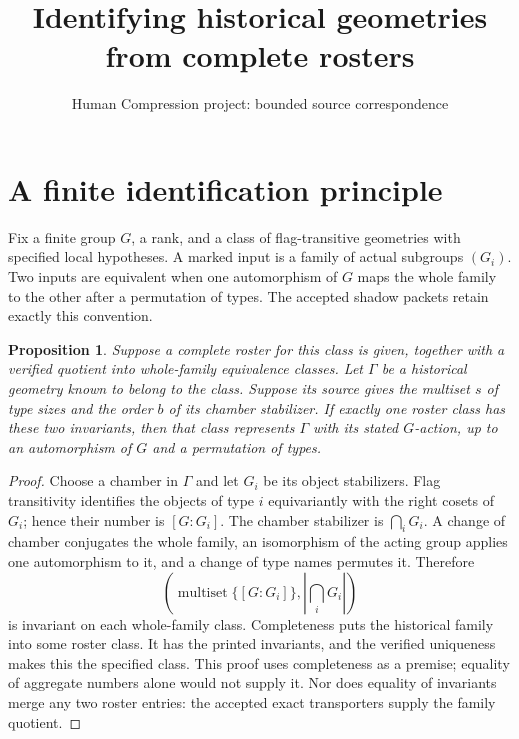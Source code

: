 \documentclass[11pt,a4paper]{article}
\title{Identifying historical geometries from complete rosters}
\author{Human Compression project: bounded source correspondence}
\date{}
\newtheorem{proposition}{Proposition}
\begin{document}
\maketitle
\section{A finite identification principle}
Fix a finite group $G$, a rank, and a class of flag-transitive geometries
with specified local hypotheses. A marked input is a family of actual
subgroups $(G_i)$. Two inputs are equivalent when one automorphism of $G$
maps the whole family to the other after a permutation of types. The
accepted shadow packets retain exactly this convention.

\begin{proposition}
Suppose a complete roster for this class is given, together with a
verified quotient into whole-family equivalence classes. Let $\Gamma$
be a historical geometry known to belong to the class. Suppose its
source gives the multiset $s$ of type sizes and the order $b$ of its
chamber stabilizer. If exactly one roster class has these two invariants,
then that class represents $\Gamma$ with its stated $G$-action, up to
an automorphism of $G$ and a permutation of types.
\end{proposition}
\begin{proof}
Choose a chamber in $\Gamma$ and let $G_i$ be its object stabilizers.
Flag transitivity identifies the objects of type $i$ equivariantly with
the right cosets of $G_i$; hence their number is $[G:G_i]$. The chamber
stabilizer is $\bigcap_iG_i$. A change of chamber conjugates the whole
family, an isomorphism of the acting group applies one automorphism to
it, and a change of type names permutes it. Therefore
\[
 \left(\operatorname{multiset}\{[G:G_i]\},
       \left|\bigcap_iG_i\right|\right)
\]
is invariant on each whole-family class. Completeness puts the historical
family into some roster class. It has the printed invariants, and the
verified uniqueness makes this the specified class. This proof uses
completeness as a premise; equality of aggregate numbers alone would not
supply it. Nor does equality of invariants merge any two roster entries:
the accepted exact transporters supply the family quotient.
\end{proof}
\end{document}
